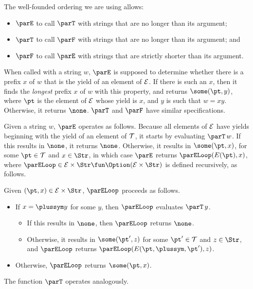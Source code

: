 The well-founded ordering we are using allows:
\begin{itemize}
\item $\parE$ to call $\parT$ with strings that are no longer
  than its argument;

\item $\parT$ to call $\parF$ with strings that are no longer
  than its argument; and

\item $\parF$ to call $\parE$ with strings that are strictly shorter
  than its argument.
\end{itemize}

When called with a string $w$, $\parE$ is supposed to
determine whether there is a prefix $x$ of $w$ that is the
yield of an element of $\cal E$.  If there is such an $x$,
then it finds the \emph{longest} prefix $x$ of $w$ with this
property, and returns $\some(\pt,y)$, where $\pt$ is the
element of $\cal E$ whose yield is $x$, and $y$ is such
that $w=xy$.  Otherwise, it returns $\none$.
$\parT$ and $\parF$ have similar specifications.

Given a string $w$, $\parE$ operates as follows.  Because all elements
of $\cal E$ have yields beginning with the yield of an element of
$\cal T$, it starts by evaluating $\parT\,w$.  If this results in
$\none$, it returns $\none$.  Otherwise, it results in $\some(\pt,x)$,
for some $\pt\in{\cal T}$ and $x\in\Str$, in which case $\parE$
returns $\parELoop(E(\pt), x)$, where $\parELoop\in{\cal
  E}\times\Str\fun\Option({\cal E}\times\Str)$ is defined recursively,
as follows.

Given $(\pt, x)\in{\cal E}\times\Str$, $\parELoop$ proceeds as
follows.
\begin{itemize}
\item If $x={\plussym}y$ for some $y$, then $\parELoop$ evaluates
  $\parT\,y$.
  \begin{itemize}
  \item If this results in $\none$, then $\parELoop$ returns $\none$.
  
  \item Otherwise, it results in $\some(\pt',z)$ for some
    $\pt'\in{\cal T}$ and $z\in\Str$, and $\parELoop$ returns
    $\parELoop(E(\pt,\plussym,\pt'),z)$.
  \end{itemize}

\item Otherwise, $\parELoop$ returns $\some(\pt,x)$.
\end{itemize}
The function $\parT$ operates analogously.

